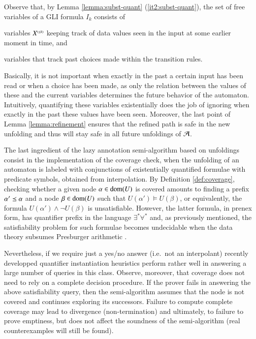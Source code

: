 Observe that, by Lemma \ref{lemma:subst-quant}
(\ref{it2:subst-quant}), the set of free variables of a GLI formula
$I_k$ consists of \begin{inparaenum}[(i)]
\item variables ${X}^{\scriptscriptstyle{({\leq k})}}$ keeping track of data values seen
  in the input at some earlier moment in time, and
%
\item variables that track past choices made within the transition
  rules.
\end{inparaenum}
Basically, it is not important when exactly in the past a certain
input has been read or when a choice has been made, as only the
relation between the values of these and the current variables
determines the future behavior of the automaton. Intuitively,
quantifying these variables existentially does the job of ignoring
when exactly in the past these values have been seen. Moreover, the
last point of Lemma \ref{lemma:refinement} ensures that the refined
path is safe in the new unfolding and thus will stay safe in all
future unfoldings of $\mathcal{A}$. 

The last ingredient of the lazy annotation semi-algorithm based on
unfoldings consist in the implementation of the coverage check, when
the unfolding of an automaton is labeled with conjunctions of
existentially quantified formulae with predicate symbols, obtained
from interpolation. By Definition \ref{def:coverage}, checking whether
a given node $\alpha \in \mathrm{dom}(U)$ is covered amounts to finding a
prefix $\alpha' \preceq \alpha$ and a node $\beta \in \mathrm{dom}(U)$ such
that $U(\alpha') \models U(\beta)$, or equivalently, the formula
$U(\alpha') \wedge \neg U(\beta)$ is unsatisfiable. However, the
latter formula, in prenex form, has quantifier prefix in the language
$\exists^*\forall^*$ and, as previously mentioned, the satisfiability
problem for such formulae becomes undecidable when the data theory
subsumes Presburger arithmetic \cite{Halpern91}.

Nevertheless, if we require just a yes/no answer (i.e.\ not an
interpolant) recently developped quantifier instantiation heuristics
\cite{ReynoldsKK17} perform rather well in answering a large number of
queries in this class. Observe, moreover, that coverage does not need
to rely on a complete decision procedure. If the prover fails in
answering the above satisfiability query, then the semi-algorithm
assumes that the node is not covered and continues exploring its
successors. Failure to compute complete coverage may lead to
divergence (non-termination) and ultimately, to failure to prove
emptiness, but does not affect the soundness of the semi-algorithm
(real counterexamples will still be found).

